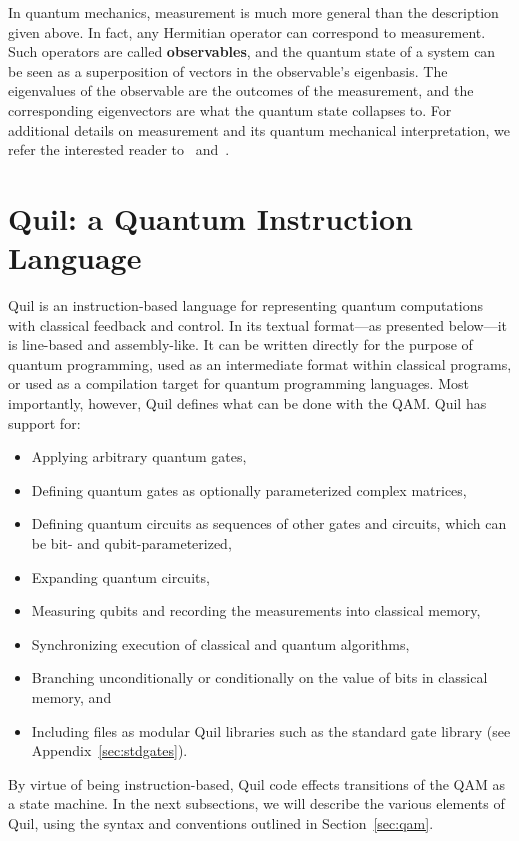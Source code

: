 \documentclass[conference]{IEEEtran}
\newcommand{\defn}[1]{\textbf{#1}}
\begin{document}
In quantum mechanics, measurement is much more general than the description given above. In fact, any Hermitian operator can correspond to measurement. Such operators are called \defn{observables}, and the quantum state of a system can be seen as a superposition of vectors in the observable's eigenbasis. The eigenvalues of the observable are the outcomes of the measurement, and the corresponding eigenvectors are what the quantum state collapses to. For additional details on measurement and its quantum mechanical interpretation, we refer the interested reader to~\cite{nielsen2010quantum} and~\cite{aaronson2013quantum}.

\section{Quil: a Quantum Instruction Language}\label{sec:quil}
Quil is an instruction-based language for representing quantum computations with classical feedback and control. In its textual format---as presented below---it is line-based and assembly-like. It can be written directly for the purpose of quantum programming, used as an intermediate format within classical programs, or used as a compilation target for quantum programming languages. Most importantly, however, Quil defines what can be done with the QAM. Quil has support for:
\begin{itemize}
\item Applying arbitrary quantum gates,
\item Defining quantum gates as optionally parameterized complex matrices,
\item Defining quantum circuits as sequences of other gates and circuits, which can be bit- and qubit-parameterized,
\item Expanding quantum circuits,
\item Measuring qubits and recording the measurements into classical memory,
\item Synchronizing execution of classical and quantum algorithms,
\item Branching unconditionally or conditionally on the value of bits in classical memory, and
\item Including files as modular Quil libraries such as the standard gate library (see Appendix~\ref{sec:stdgates}).
\end{itemize}
By virtue of being instruction-based, Quil code effects transitions of the QAM as a state machine. In the next subsections, we will describe the various elements of Quil, using the syntax and conventions outlined in Section~\ref{sec:qam}.
\end{document}
